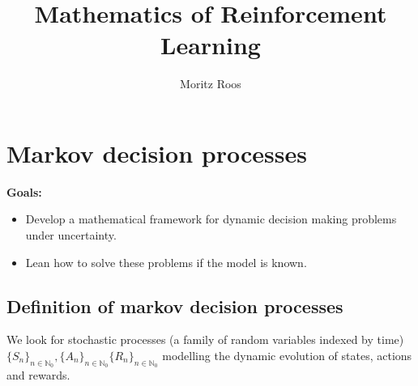 







\title{Mathematics of Reinforcement Learning}

\author{Moritz Roos}
\date{}

\maketitle

\tableofcontents


\clearpage
\section{Markov decision processes}

\textbf{Goals:}
\begin{itemize}
    \item Develop a mathematical framework for dynamic decision making problems under uncertainty.
    \item Lean how to solve these problems if the model is known.
\end{itemize}

\subsection{Definition of markov decision processes}
We look for stochastic processes (a family of random variables indexed by time) \( \{S_n\}_{n \in  \mathbb{N}_0 }, \{A_n\}_{n \in \mathbb{N}_{0}} \{R_n\}_{n \in \mathbb{N}_{0}} \) modelling the dynamic evolution of states, actions and rewards.

